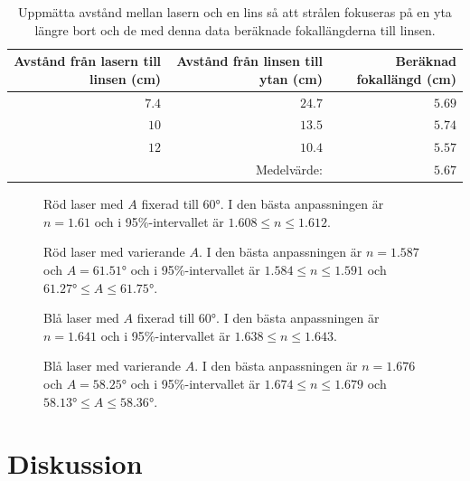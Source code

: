 \documentclass[a4paper]{article}
\begin{document}
\begin{table}[h]
	\centering
	\caption{Uppmätta avstånd mellan lasern och en lins så att strålen fokuseras på en yta längre bort och de med denna data beräknade fokallängderna till linsen.}
	\label{tab:foc}
	\begin{tabular}{|r|r|r|}\hline %
		Avstånd från lasern till linsen (cm) & Avstånd från linsen till ytan (cm) & Beräknad fokallängd (cm) \\\hline
		$7.4$ & $24.7$ & $5.69$ \\\hline
		$10$ & $13.5$ & $5.74$ \\\hline
		$12$ & $10.4$ & $5.57$ \\\hline
		& Medelvärde: & $5.67$ \\\hline
	\end{tabular}
\end{table}
\begin{figure}[h]
	\centering
	
	\caption{Röd laser med $A$ fixerad till $60°$. I den bästa anpassningen är $n=1.61$ och i 95\%-intervallet är $1.608\le n \le1.612$.}
	\label{fig:red60}
\end{figure}
\begin{figure}[h]
	\centering
	
	\caption{Röd laser med varierande $A$. I den bästa anpassningen är $n=1.587$ och $A=61.51°$ och i 95\%-intervallet är $1.584\le n \le1.591$ och $61.27°\le A \le61.75°$.}
	\label{fig:red}
\end{figure}
\begin{figure}[h]
	\centering
	
	\caption{Blå laser med $A$ fixerad till $60°$. I den bästa anpassningen är $n=1.641$ och i 95\%-intervallet är $1.638\le n \le1.643$.}
	\label{fig:blue60}
\end{figure}
\begin{figure}[h]
	\centering
	
	\caption{Blå laser med varierande $A$. I den bästa anpassningen är $n=1.676$ och $A=58.25°$ och i 95\%-intervallet är $1.674\le n \le1.679$ och $58.13°\le A \le58.36°$.}
	\label{fig:blue}
\end{figure}

\FloatBarrier

\section{Diskussion}
  
  
\end{document}
